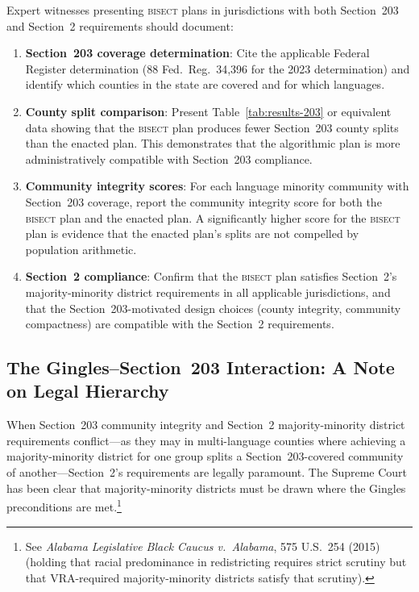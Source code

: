 Expert witnesses presenting \textsc{bisect} plans in jurisdictions with
both Section~203 and Section~2 requirements should document:

\begin{enumerate}
\item \textbf{Section~203 coverage determination}: Cite the applicable
  Federal Register determination (88 Fed.\ Reg.\ 34,396 for the 2023
  determination) and identify which counties in the state are covered
  and for which languages.

\item \textbf{County split comparison}: Present Table~\ref{tab:results-203}
  or equivalent data showing that the \textsc{bisect} plan produces fewer
  Section~203 county splits than the enacted plan. This demonstrates
  that the algorithmic plan is more administratively compatible with
  Section~203 compliance.

\item \textbf{Community integrity scores}: For each language minority
  community with Section~203 coverage, report the community integrity
  score for both the \textsc{bisect} plan and the enacted plan. A
  significantly higher score for the \textsc{bisect} plan is evidence
  that the enacted plan's splits are not compelled by population arithmetic.

\item \textbf{Section~2 compliance}: Confirm that the \textsc{bisect}
  plan satisfies Section~2's majority-minority district requirements
  in all applicable jurisdictions, and that the Section~203-motivated
  design choices (county integrity, community compactness) are compatible
  with the Section~2 requirements.
\end{enumerate}

\subsection{The Gingles--Section~203 Interaction: A Note on Legal Hierarchy}

When Section~203 community integrity and Section~2 majority-minority
district requirements conflict---as they may in multi-language counties
where achieving a majority-minority district for one group splits a
Section~203-covered community of another---Section~2's requirements are
legally paramount. The Supreme Court has been clear that majority-minority
districts must be drawn where the Gingles preconditions are met.\footnote{
See \textit{Alabama Legislative Black Caucus v.\ Alabama}, 575 U.S.\ 254 (2015)
(holding that racial predominance in redistricting requires strict scrutiny
but that VRA-required majority-minority districts satisfy that scrutiny).}

